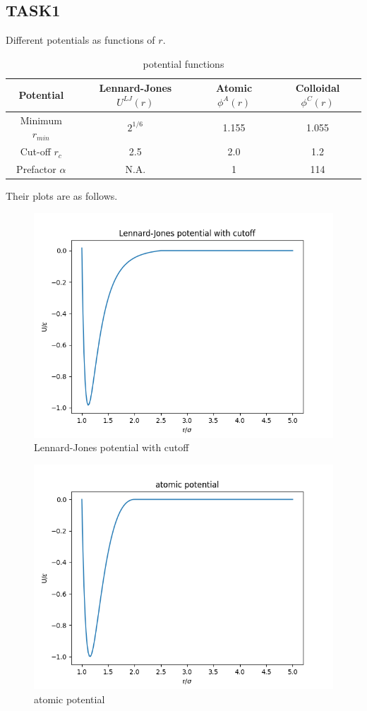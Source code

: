 \documentclass[letterpaper,12pt]{article}
\numberwithin{equation}{section}
\begin{document}
\subsection{TASK1}
Different potentials as functions of $r$. 
\begin{table}[H]
    \centering
    \caption{potential functions}
    \label{tab:potentials}
    
    \begin{tabular}{|c|c|c|c|}
    \hline
    \parbox[c][1.2cm][c]{2cm}{\centering Potential} & \parbox[c][0.8cm][c]{3cm}{\centering Lennard-Jones $U^{LJ}(r)$} & \parbox[c][0.8cm][c]{2.3cm}{\centering Atomic $\phi^A(r)$} & \parbox[c][0.8cm][c]{2.5cm}{\centering Colloidal $\phi^C(r)$} \\
    \hline
    \rule{0pt}{0.5cm} Minimum $r_{min}$ & $2^{1/6}$ & 1.155 & 1.055 \\
    \rule{0pt}{0.5cm} Cut-off $r_c$ & 2.5 & 2.0 & 1.2 \\
    \rule{0pt}{0.5cm}  Prefactor $\alpha$ & N.A. & 1 & 114 \\
    \hline
    \end{tabular}
    
\end{table}
Their plots are as follows.

\begin{figure}[H]
    \centering
    \includegraphics[width=.8\textwidth]{lj_cutoff.png}
    \caption{Lennard-Jones potential with cutoff}
\end{figure}

\begin{figure}[H]
    \centering
    \includegraphics[width=.8\textwidth]{phi_A.png}
    \caption{atomic potential}
\end{figure}
\end{document}
